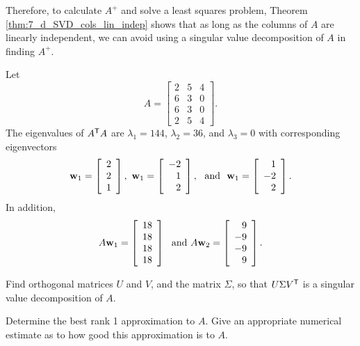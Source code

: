 Therefore, to calculate $A^{+}$ and solve a least squares problem, Theorem \ref{thm:7_d_SVD_cols_lin_indep} shows that as long as the columns of $A$ are linearly independent, we can avoid using a singular value decomposition of $A$ in finding $A^{+}$. 


\ExampleIntro

\begin{example} Let
\[A = \left[ \begin{array}{ccc} 2&5&4\\6&3&0\\6&3&0\\2&5&4 \end{array} \right].\]
The eigenvalues of $A^{\mathsf{T}}A$ are $\lambda_1 = 144$, $\lambda_2 = 36$, and $\lambda_3=0$ with corresponding eigenvectors
\[\mathbf{w}_1 = \left[ \begin{array}{c} 2\\2\\1 \end{array} \right], \ \mathbf{w}_1 = \left[ \begin{array}{r} -2\\1\\2 \end{array} \right], \ \text{ and } \ \mathbf{w}_1 = \left[ \begin{array}{r} 1\\-2\\2 \end{array} \right].\]
In addition,
\[A \mathbf{w}_1 = \left[ \begin{array}{c} 18\\18\\18\\18 \end{array} \right] \ \text{ and } A \mathbf{w}_2 = \left[ \begin{array}{r} 9\\-9\\-9\\9 \end{array} \right].\]
\ba

\item Find orthogonal matrices $U$ and $V$, and the matrix $\Sigma$, so that $U \Sigma V^{\mathsf{T}}$ is a singular value decomposition of $A$.

\item Determine the best rank 1 approximation to $A$. Give an appropriate numerical estimate as to how good this approximation is to $A$.


\end{example}
